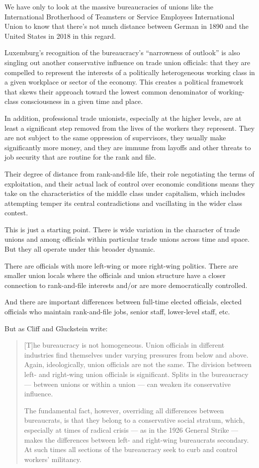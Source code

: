 We have only to look at the massive bureaucracies of unions like the International Brotherhood of Teamsters or Service Employees International Union to know that there’s not much distance between German in 1890 and the United States in 2018 in this regard.

Luxemburg’s recognition of the bureaucracy’s “narrowness of outlook” is also singling out another conservative influence on trade union officials: that they are compelled to represent the interests of a politically heterogeneous working class in a given workplace or sector of the economy. This creates a political framework that skews their approach toward the lowest common denominator of working-class consciousness in a given time and place.

In addition, professional trade unionists, especially at the higher levels, are at least a significant step removed from the lives of the workers they represent. They are not subject to the same oppression of supervisors, they usually make significantly more money, and they are immune from layoffs and other threats to job security that are routine for the rank and file.

Their degree of distance from rank-and-file life, their role negotiating the terms of exploitation, and their actual lack of control over economic conditions means they take on the characteristics of the middle class under capitalism, which includes attempting temper its central contradictions and vacillating in the wider class contest.

This is just a starting point. There is wide variation in the character of trade unions and among officials within particular trade unions across time and space. But they all operate under this broader dynamic.

There are officials with more left-wing or more right-wing politics. There are smaller union locals where the officials and union structure have a closer connection to rank-and-file interests and/or are more democratically controlled.

And there are important differences between full-time elected officials, elected officials who maintain rank-and-file jobs, senior staff, lower-level staff, etc.

But as Cliff and Gluckstein write:

\blockquote{
[T]he bureaucracy is not homogeneous. Union officials in different industries find themselves under varying pressures from below and above. Again, ideologically, union officials are not the same. The division between left- and right-wing union officials is significant. Splits in the bureaucracy — between unions or within a union — can weaken its conservative influence.

The fundamental fact, however, overriding all differences between bureaucrats, is that they belong to a conservative social stratum, which, especially at times of radical crisis — as in the 1926 General Strike — makes the differences between left- and right-wing bureaucrats secondary. At such times all sections of the bureaucracy seek to curb and control workers’ militancy. 
}

